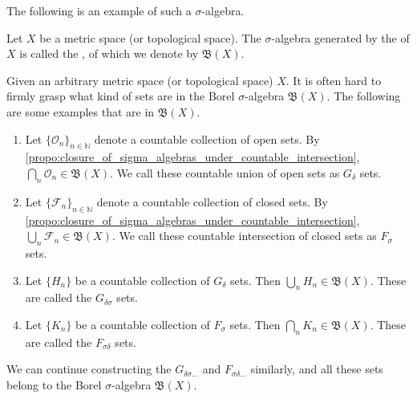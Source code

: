 \documentclass[notoc,notitlepage]{tufte-book}
\begin{document}
The following is an example of such a $\sigma$-algebra.

\begin{defn}\label{defn:borel_sigma_algebra}
  Let $X$ be a metric space (or topological space).
  The $\sigma$-algebra generated by the 
  of $X$ is called the ,
  of which we denote by $\mathfrak{B}(X)$.
\end{defn}

\begin{remark}
  Given an arbitrary metric space (or topological space) $X$.
  It is often hard to firmly grasp what kind of sets are in
  the Borel $\sigma$-algebra $\mathfrak{B}(X)$.
  The following are some examples that are in $\mathfrak{B}(X)$.
  \begin{enumerate}
    \item Let $\{ \mathcal{O}_n \}_{n \in \mathbb{N}}$ denote
      a countable collection of open sets.
      By \cref{propo:closure_of_sigma_algebras_under_countable_intersection},
      $\bigcap_{n} \mathcal{O}_n \in \mathfrak{B}(X)$.
      We call these countable union of open sets
      as $G_\delta$ sets.
    \item Let $\{ \mathcal{F}_n \}_{n \in \mathbb{N}}$ denote
      a countable collection of closed sets.
      By \cref{propo:closure_of_sigma_algebras_under_countable_intersection},
      $\bigcup_{n} \mathcal{F}_n \in \mathfrak{B}(X)$.
      We call these countable intersection of closed sets
      as $F_\sigma$ sets.
    \item Let $\{ H_n \}$ be a countable collection of $G_\delta$ sets.
      Then $\bigcup_{n} H_n \in \mathfrak{B}(X)$.
      These are called the $G_{\delta \sigma}$ sets.
    \item Let $\{ K_n \}$ be a countable collection of $F_\sigma$ sets.
      Then $\bigcap_{n} K_n \in \mathfrak{B}(X)$.
      These are called the $F_{\sigma \delta}$ sets.
  \end{enumerate}
  We can continue constructing the $G_{\delta \sigma \hdots}$
  and $F_{\sigma \delta \hdots}$ similarly,
  and all these sets belong to the Borel $\sigma$-algebra
  $\mathfrak{B}(X)$.
\end{remark}
\end{document}
